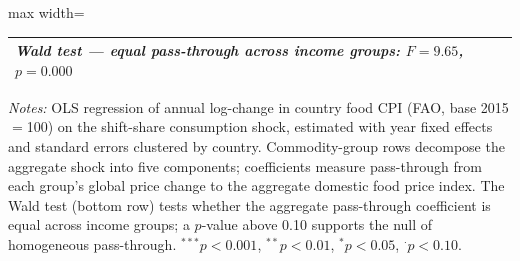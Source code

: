 \begin{table}[htbp]
\begin{adjustbox}{max width=\textwidth}
\begin{threeparttable}
\begin{tabular}{l rrrrr}
\midrule
\multicolumn{6}{l}{\textit{Wald test — equal pass-through across income groups: $F = 9.65$, $p = 0.000$}} \\
\bottomrule
\end{tabular}
\begin{tablenotes}\small
\item \textit{Notes:} OLS regression of annual log-change in country food CPI (FAO, base 2015$=$100) on the shift-share consumption shock, estimated with year fixed effects and standard errors clustered by country. Commodity-group rows decompose the aggregate shock into five components; coefficients measure pass-through from each group's global price change to the aggregate domestic food price index. The Wald test (bottom row) tests whether the aggregate pass-through coefficient is equal across income groups; a $p$-value above 0.10 supports the null of homogeneous pass-through. $^{***}p<0.001$, $^{**}p<0.01$, $^{*}p<0.05$, $^{\cdot}p<0.10$.
\end{tablenotes}
\end{threeparttable}
\end{adjustbox}
\end{table}
